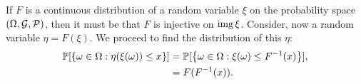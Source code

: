 \begin{solution}
    If $F$ is a continuous distribution of a random variable $\xi$ on the probability space $(\Omega, \mathcal{G}, \mathcal{P})$, then it must be that $F$ is injective on $\operatorname{img} \xi$. Consider, now a random variable $\eta = F(\xi)$. We proceed to find the distribution of this $\eta$:
    \begin{align*}
        \mathbb{P}[\left\{ \omega \in \Omega: \eta(\xi(\omega)) \leq x \right\}] &= \mathbb{P}[\left\{ \omega \in \Omega: \xi(\omega) \leq F^{-1}(x) \right\}], \\
        &= F(F^{-1}(x)).
    \end{align*}
\end{solution}
